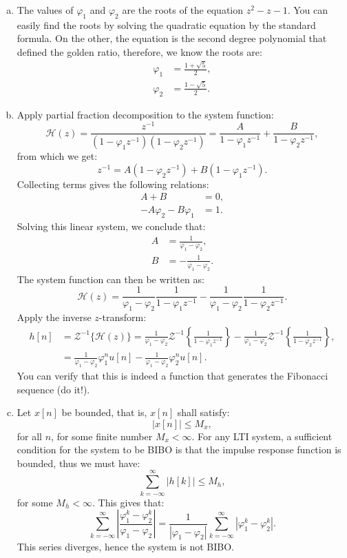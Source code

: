 \begin{enumerate}
\begin{enumerate}[a)]
\item The values of $\varphi_{1}$ and $\varphi_{2}$ are the roots of the equation $z^{2}-z-1$. You can easily find the roots by solving the quadratic equation by the standard formula. On the other, the equation is the second degree polynomial that defined the golden ratio, therefore, we know the roots are:
\begin{align*}
    \varphi_{1} &= \frac{1+\sqrt{5}}{2}, \\
    \varphi_{2} &= \frac{1-\sqrt{5}}{2}.
\end{align*}

\item Apply partial fraction decomposition to the system function:
$$\mathcal{H}(z)=\frac{z^{-1}}{(1-\varphi_{1}z^{-1})(1-\varphi_{2}z^{-1})}=\frac{A}{1-\varphi_{1}z^{-1}}+\frac{B}{1-\varphi_{2}z^{-1}},$$
from which we get:
$$z^{-1}=A(1-\varphi_{2}z^{-1})+B(1-\varphi_{1}z^{-1}).$$
Collecting terms gives the following relations:
\begin{align*}
    A + B &= 0, \\
    -A\varphi_{2}-B\varphi_{1} &= 1.
\end{align*}
Solving this linear system, we conclude that:
\begin{align*}
    A &= \frac{1}{\varphi_{1}-\varphi_{2}}, \\
    B &= -\frac{1}{\varphi_{1}-\varphi_{2}}.
\end{align*}
The system function can then be written as:
$$\mathcal{H}(z)=\frac{1}{\varphi_{1}-\varphi_{2}}\frac{1}{1-\varphi_{1}z^{-1}}-\frac{1}{\varphi_{1}-\varphi_{2}}\frac{1}{1-\varphi_{2}z^{-1}}.$$
Apply the inverse $z$-transform:
\begin{align*}
    h[n]&=\mathcal{Z}^{-1}\{\mathcal{H}(z)\}=\frac{1}{\varphi_{1}-\varphi_{2}}\mathcal{Z}^{-1}\left\{\frac{1}{1-\varphi_{1}z^{-1}}\right\}-\frac{1}{\varphi_{1}-\varphi_{2}}\mathcal{Z}^{-1}\left\{\frac{1}{1-\varphi_{2}z^{-1}}\right\}, \\
    &=\frac{1}{\varphi_{1}-\varphi_{2}}\varphi_{1}^{n}u[n] - \frac{1}{\varphi_{1}-\varphi_{2}}\varphi_{2}^{n}u[n].
\end{align*}
You can verify that this is indeed a function that generates the Fibonacci sequence (do it!).

\item Let $x[n]$ be bounded, that is, $x[n]$ shall satisfy:
$$|x[n]|\le M_{x},$$
for all $n$, for some finite number $M_{x}<\infty$. For any LTI system, a sufficient condition for the system to be BIBO is that the impulse response function is bounded, thus we must have:
$$\sum_{k=-\infty}^{\infty}|h[k]|\le M_{h},$$
for some $M_{h}<\infty$. This gives that:
$$\sum_{k=-\infty}^{\infty}\left|\frac{\varphi_{1}^{k}-\varphi_{2}^{k}}{\varphi_{1}-\varphi_{2}}\right|=\frac{1}{|\varphi_{1}-\varphi_{2}|}\sum_{k=-\infty}^{\infty}|\varphi_{1}^{k}-\varphi_{2}^{k}|.$$
This series diverges, hence the system is not BIBO. 


\end{enumerate}
\end{enumerate}
